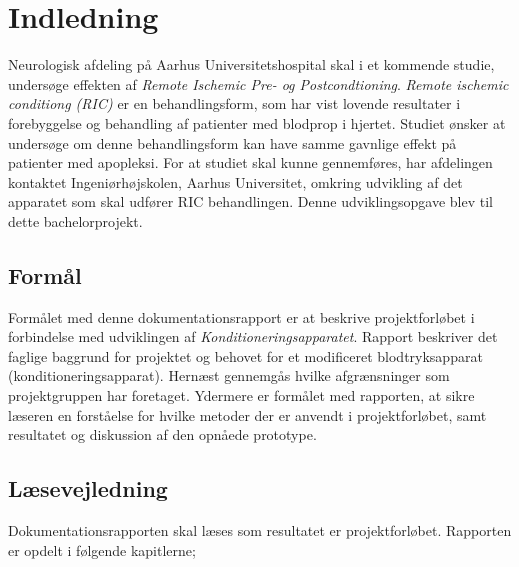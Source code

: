 \chapter{Indledning}
Neurologisk afdeling på Aarhus Universitetshospital skal i et kommende studie, undersøge effekten af \textit{Remote Ischemic Pre- og Postcondtioning}. \textit{Remote ischemic conditiong (RIC)} er en behandlingsform, som har vist lovende resultater i forebyggelse og behandling af patienter med blodprop i hjertet. Studiet ønsker at undersøge om denne behandlingsform kan have samme gavnlige effekt på patienter med apopleksi. For at studiet skal kunne gennemføres, har afdelingen kontaktet Ingeniørhøjskolen, Aarhus Universitet, omkring udvikling af det apparatet som skal udfører RIC behandlingen. Denne udviklingsopgave blev til dette bachelorprojekt. 

\section{Formål}
Formålet med denne dokumentationsrapport er at beskrive projektforløbet i forbindelse med udviklingen af \textit{Konditioneringsapparatet}. Rapport beskriver det faglige baggrund for projektet og behovet for et modificeret blodtryksapparat (konditioneringsapparat). Hernæst gennemgås hvilke afgrænsninger som projektgruppen har foretaget. Ydermere er formålet med rapporten, at sikre læseren en forståelse for hvilke metoder der er anvendt i projektforløbet, samt resultatet og diskussion af den opnåede prototype. 

\section{Læsevejledning}
Dokumentationsrapporten skal læses som resultatet er projektforløbet. Rapporten er opdelt i følgende kapitlerne;

